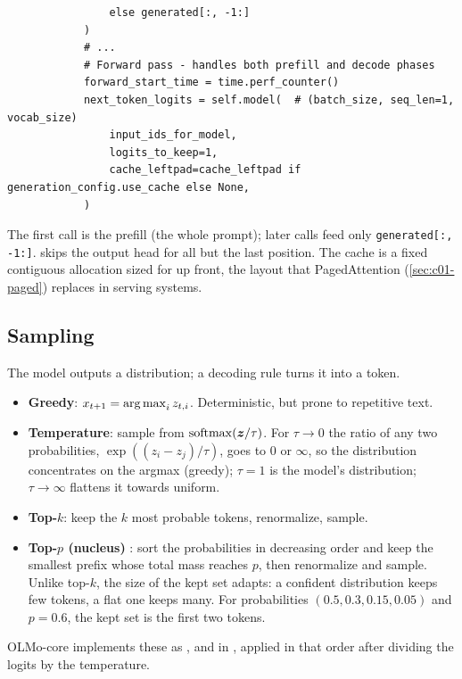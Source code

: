 \begin{implnote}[title={In the code: the KV cache and the generation loop in OLMo-core}]
\begin{lstlisting}
                else generated[:, -1:]
            )
            # ...
            # Forward pass - handles both prefill and decode phases
            forward_start_time = time.perf_counter()
            next_token_logits = self.model(  # (batch_size, seq_len=1, vocab_size)
                input_ids_for_model,
                logits_to_keep=1,
                cache_leftpad=cache_leftpad if generation_config.use_cache else None,
            )
\end{lstlisting}
The first call is the prefill (the whole prompt); later calls feed only
\texttt{generated[:, -1:]}.  skips the output head for all but the
last position. The cache is a fixed contiguous allocation sized for 
up front, the layout that PagedAttention (\cref{sec:c01-paged}) replaces in serving systems.
\end{implnote}

\subsection{Sampling}\label{sec:c01-sampling}

The model outputs a distribution; a decoding rule turns it into a token.
\begin{itemize}
  \item \textbf{Greedy}: $x_{t+1} = \operatorname*{arg\,max}_i z_{t,i}$. Deterministic, but prone to
  repetitive text.
  \item \textbf{Temperature}: sample from $\operatorname{softmax}(\bm{z}/\tau)$. For $\tau \to 0$ the ratio
  of any two probabilities, $\exp((z_i - z_j)/\tau)$, goes to $0$ or $\infty$, so the
  distribution concentrates on the argmax (greedy); $\tau = 1$ is the model's distribution;
  $\tau \to \infty$ flattens it towards uniform.
  \item \textbf{Top-$k$}: keep the $k$ most probable tokens, renormalize, sample.
  \item \textbf{Top-$p$ (nucleus)} \citep{c01-holtzman2020degeneration}: sort the
  probabilities in decreasing order and keep the smallest prefix whose total mass reaches
  $p$, then renormalize and sample. Unlike top-$k$, the size of the kept set adapts: a
  confident distribution keeps few tokens, a flat one keeps many. For probabilities
  $(0.5, 0.3, 0.15, 0.05)$ and $p = 0.6$, the kept set is the first two tokens.
\end{itemize}
OLMo-core implements these as ,  and
 in ,
applied in that order after dividing the logits by the temperature.

